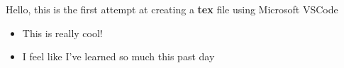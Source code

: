 \documentclass[10pt]{article}
\begin{document}
    \newpage
    Hello, this is the first attempt at creating a \textbf{tex} file using Microsoft VSCode
    \begin{itemize}
        \item This is really cool!
        \item I feel like I've learned so much this past day
    \end{itemize}
\end{document}
